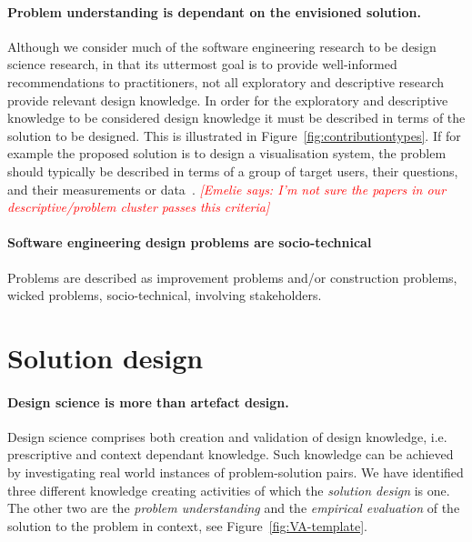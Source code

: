\documentclass[graybox]{svmult}
\newcommand{\emelie}[1]{\textcolor{red}{{\it [Emelie says: #1]}}}
\newcommand{\emelie}[1]{}
\begin{document}
\paragraph{Problem understanding is dependant on the envisioned solution.}Although we consider much of the software engineering research to be design science research, in that its uttermost goal is to provide well-informed recommendations to practitioners, not all exploratory and descriptive research provide relevant design knowledge. In order for the exploratory and descriptive knowledge to be considered design knowledge it must be described in terms of the solution to be designed. This is illustrated in Figure~\ref{fig:contributiontypes}. If for example the proposed solution is to design a visualisation system, the problem should typically be described in terms of a group of target users, their questions, and their measurements or data~\cite{meyer_nested_2015}. \emelie{I'm not sure the papers in our descriptive/problem cluster passes this criteria}

\paragraph{Software engineering design problems are socio-technical}
Problems are described as improvement problems and/or construction problems, wicked problems, socio-technical, involving stakeholders. 



\section{Solution design}
\paragraph{Design science is more than artefact design.}

Design science comprises both creation and validation of design knowledge, i.e. prescriptive and context dependant knowledge. Such knowledge can be achieved by investigating real world instances of problem-solution pairs. We have identified three different knowledge creating activities of which the \emph{solution design} is one. The other two are the \emph{problem understanding} and the \emph{empirical evaluation} of the solution to the problem in context, see Figure~\ref{fig:VA-template}.
\end{document}
